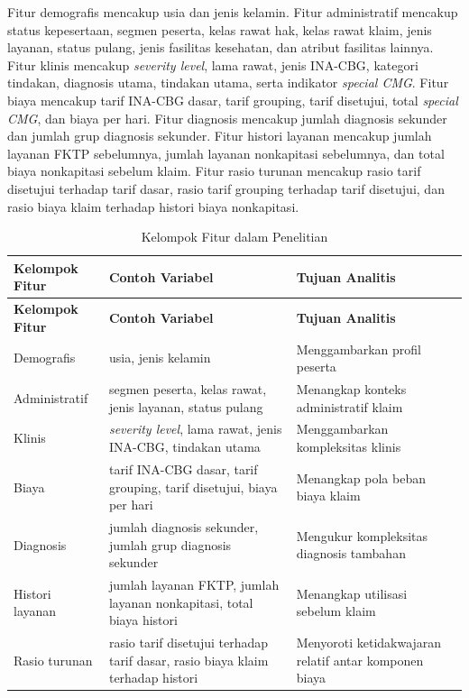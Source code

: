 Fitur demografis mencakup usia dan jenis kelamin. Fitur administratif mencakup status kepesertaan, segmen peserta, kelas rawat hak, kelas rawat klaim, jenis layanan, status pulang, jenis fasilitas kesehatan, dan atribut fasilitas lainnya. Fitur klinis mencakup \emph{severity level}, lama rawat, jenis INA-CBG, kategori tindakan, diagnosis utama, tindakan utama, serta indikator \emph{special CMG}. Fitur biaya mencakup tarif INA-CBG dasar, tarif grouping, tarif disetujui, total \emph{special CMG}, dan biaya per hari. Fitur diagnosis mencakup jumlah diagnosis sekunder dan jumlah grup diagnosis sekunder. Fitur histori layanan mencakup jumlah layanan FKTP sebelumnya, jumlah layanan nonkapitasi sebelumnya, dan total biaya nonkapitasi sebelum klaim. Fitur rasio turunan mencakup rasio tarif disetujui terhadap tarif dasar, rasio tarif grouping terhadap tarif disetujui, dan rasio biaya klaim terhadap histori biaya nonkapitasi.

\begin{longtable}[]{@{}p{}p{}p{}@{}}
\caption{Kelompok Fitur dalam Penelitian}\label{tab:kelompok-fitur}\\
\toprule
\textbf{Kelompok Fitur} & \textbf{Contoh Variabel} & \textbf{Tujuan Analitis} \\
\midrule
\endfirsthead
\toprule
\textbf{Kelompok Fitur} & \textbf{Contoh Variabel} & \textbf{Tujuan Analitis} \\
\midrule
\endhead
\bottomrule
\endfoot
Demografis & usia, jenis kelamin & Menggambarkan profil peserta \\
Administratif & segmen peserta, kelas rawat, jenis layanan, status pulang & Menangkap konteks administratif klaim \\
Klinis & \emph{severity level}, lama rawat, jenis INA-CBG, tindakan utama & Menggambarkan kompleksitas klinis \\
Biaya & tarif INA-CBG dasar, tarif grouping, tarif disetujui, biaya per hari & Menangkap pola beban biaya klaim \\
Diagnosis & jumlah diagnosis sekunder, jumlah grup diagnosis sekunder & Mengukur kompleksitas diagnosis tambahan \\
Histori layanan & jumlah layanan FKTP, jumlah layanan nonkapitasi, total biaya histori & Menangkap utilisasi sebelum klaim \\
Rasio turunan & rasio tarif disetujui terhadap tarif dasar, rasio biaya klaim terhadap histori & Menyoroti ketidakwajaran relatif antar komponen biaya \\
\end{longtable}

